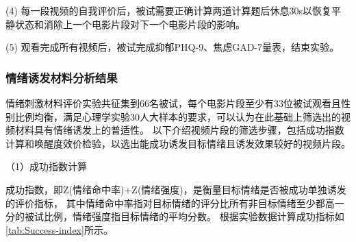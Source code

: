(4)	每一段视频的自我评价后，被试需要正确计算两道计算题后休息30s以恢复平静状态和消除上一个电影片段对下一个电影片段的影响。

(5)	观看完成所有视频后，被试完成抑郁PHQ-9、焦虑GAD-7量表，结束实验。


\subsubsection{情绪诱发材料分析结果}
情绪刺激材料评价实验共征集到66名被试，每个电影片段至少有33位被试观看且性别比例均衡，满足心理学实验30人大样本的要求，可以认为在此基础上筛选出的视频材料具有情绪诱发上的普适性。
以下介绍视频片段的筛选步骤，包括成功指数计算和唤醒度效价检验，以选出能成功诱发目标情绪且诱发效果较好的视频片段。

（1）成功指数计算

成功指数，即Z(情绪命中率)+Z(情绪强度)，是衡量目标情绪是否被成功单独诱发的评价指标，
其中情绪命中率指对目标情绪的评分比所有非目标情绪至少都高一分的被试比例，情绪强度指目标情绪的平均分数。
根据实验数据计算成功指标如\autoref{tab:Success-index}所示。
